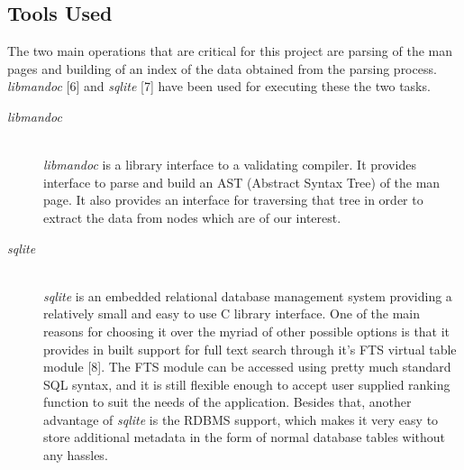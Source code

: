 \documentclass[titlepage, a4paper, 12pt]{article}
\begin{document}
\subsection{Tools Used}
The two main operations that are critical for this project are parsing of the
man pages and building of an index of the
data obtained from the parsing process. \textit{libmandoc} [6]
and \textit{sqlite} [7] have been used for executing these the two tasks.
\begin{description}
\item[\textit{libmandoc}] \hfill \\
\textit{libmandoc} is a library interface to a validating compiler. It provides
interface to parse and build an AST (Abstract Syntax Tree) of the man page. It
also provides an interface for traversing that tree in order to extract the data
from nodes which are of our interest.
\end{description}
\begin{description}
\item[\textit{sqlite}] \hfill \\
\textit{sqlite} is an embedded relational database management system providing a
relatively small and easy to use C library interface. One of the main reasons
for choosing it over the myriad of other possible options is that it provides
in built support for full text search through it's FTS virtual table module [8].
The FTS module can be accessed using pretty much standard SQL syntax, and it is
still flexible enough to accept user supplied ranking function to suit the needs
of the application. Besides that, another advantage of \textit{sqlite} is the
RDBMS support, which makes it very easy to store additional metadata in the form
of normal database tables without any hassles.
\end{description}
\end{document}
